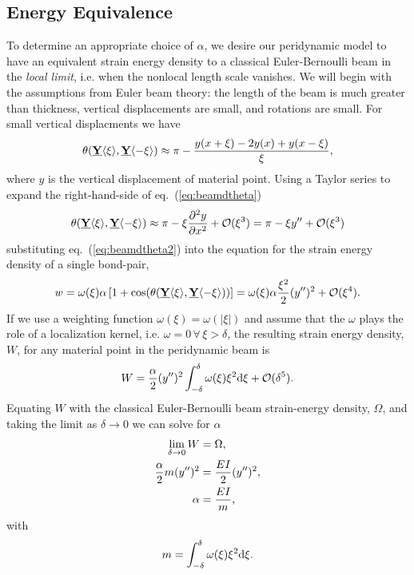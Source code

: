 \documentclass[11pt]{amsart}
\newcommand\vstate[3]{%
	\mathbf{\underline{#1}}%
	\ifstrempty{#2}{}{[#2]}%
	\ifstrempty{#3}{}{\langle #3 \rangle}}
\begin{document}
\subsection{Energy Equivalence}
%
To determine an appropriate choice of $\alpha$, we desire our peridynamic model to have an equivalent strain energy density to a classical Euler-Bernoulli beam in the \emph{local limit}, i.e. when the nonlocal length scale vanishes.  We will begin with the assumptions from Euler beam theory: the length of the beam is much greater than thickness, vertical displacements are small, and rotations are small. For small vertical displacments we have
%
\begin{equation}
\theta(\vstate{Y}{}{\xi},\vstate{Y}{}{\mathbf{-\xi}}) \approx \pi-\frac{y(x+\xi)-2y(x)+y(x-\xi)}{\xi},
\label{eq:beamdtheta}
\end{equation}
%
where $y$ is the vertical displacement of material point.  Using a Taylor series to expand the right-hand-side of eq.~(\ref{eq:beamdtheta})  
%
\begin{equation}
\theta(\vstate{Y}{}{\xi},\vstate{Y}{}{\mathbf{-\xi}}) \approx \pi-\xi \frac{\partial^2 y}{\partial x^2}+\mathcal{O}(\xi^3) =  \pi-\xi y'' +\mathcal{O}(\xi^3) 
\label{eq:beamdtheta2}
\end{equation}
%
substituting eq.~(\ref{eq:beamdtheta2}) into the equation for the strain energy density of a single bond-pair,
%
\begin{align}
\label{eq:continuousBeamw}
w = \omega(\xi) \alpha \left[1+\cos(\theta(\vstate{Y}{}{\xi},\vstate{Y}{}{\mathbf{-\xi}})) \right] = \omega(\xi) \alpha\frac{\xi^2}{2}(y'')^2 +\mathcal{O}(\xi^4).\notag
\end{align}
%
If we use a weighting function \(\omega(\xi)=\omega(|\xi|)\) and assume that the $\omega$ plays the role of a localization kernel, i.e. $\omega = 0 \, \forall \, \xi > \delta$, the resulting strain energy density, $W$, for any material point in the peridynamic beam is
%
\begin{equation}
W = \frac{\alpha}{2}(y'')^2 \int_{-\delta}^\delta \omega(\xi)\xi^2 {\rm d}\xi + \mathcal{O}(\delta^5).\notag
\end{equation}
%
Equating $W$ with the classical Euler-Bernoulli beam strain-energy density, $\Omega$, and taking the limit as $\delta \to 0$ we can solve for $\alpha$
%
\begin{align}
    \lim_{\delta \to 0}  W &= \Omega, \notag \\
    \frac{\alpha}{2} m (y'')^2 &= \frac{EI}{2} (y'')^2, \notag \\
    \alpha &= \frac{EI}{m},
\label{eq:alpha}
\end{align}
%
with 
\begin{equation}
    m = \int_{-\delta}^{\delta} \omega(\xi) \xi^2 {\rm d}\xi \notag.
\end{equation}
\end{document}
